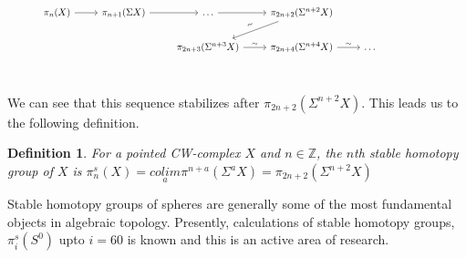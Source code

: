 \documentclass[12pt]{extarticle}
\numberwithin{equation}{section}
\newtheorem{defn}[thm]{Definition}
\newcommand{\Z}{\mathbb{Z}}
\begin{document}
\[\begin{tikzcd}
	{} & {\pi_{n}(X)} & {\pi_{n+1}(\Sigma X)} & \dots & {\pi_{2n+2}(\Sigma^{n+2}X)} && {} \\
	&&& {\pi_{2n+3}(\Sigma^{n+3}X)} & {\pi_{2n+4}(\Sigma^{n+4}X)} & \dots \\
	&&&& {} && {} && {}
	\arrow[from=1-2, to=1-3]
	\arrow[from=1-3, to=1-4]
	\arrow[from=1-4, to=1-5]
	\arrow["\rotatebox{30}{\(\sim\)}"' , from=1-5, to=2-4]
	\arrow["\sim", from=2-4, to=2-5]
	\arrow["\sim", from=2-5, to=2-6]
\end{tikzcd}\]

We can see that this sequence stabilizes after $\pi_{2n+2}(\Sigma^{n+2}X)$. This leads us to the following definition.

\begin{defn}
For a pointed CW-complex $X$ and $n \in \Z$, the $n$th stable homotopy group of $X$ is $\pi^s_n(X)= \underset{a}{colim}\pi^{n+a}(\Sigma^aX) = \pi_{2n+2}(\Sigma^{n+2}X)$
\end{defn}



Stable homotopy groups of spheres are generally some of the most fundamental objects in algebraic topology. Presently, calculations of stable homotopy groups, $\pi_i^s(S^0)$ upto $i=60$ is known and this is an active area of research.\\

\printbibliography
\end{document}
